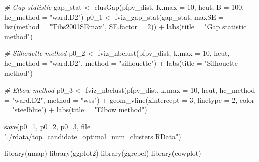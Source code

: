\documentclass[
  11pt,
  oneside]{book}
\newenvironment{Shaded}{\begin{snugshade}}{\end{snugshade}}
\newcommand{\AttributeTok}[1]{\textcolor[rgb]{0.77,0.63,0.00}{#1}}
\newcommand{\CommentTok}[1]{\textcolor[rgb]{0.56,0.35,0.01}{\textit{#1}}}
\newcommand{\DecValTok}[1]{\textcolor[rgb]{0.00,0.00,0.81}{#1}}
\newcommand{\FunctionTok}[1]{\textcolor[rgb]{0.00,0.00,0.00}{#1}}
\newcommand{\NormalTok}[1]{#1}
\newcommand{\OtherTok}[1]{\textcolor[rgb]{0.56,0.35,0.01}{#1}}
\newcommand{\SpecialCharTok}[1]{\textcolor[rgb]{0.00,0.00,0.00}{#1}}
\newcommand{\StringTok}[1]{\textcolor[rgb]{0.31,0.60,0.02}{#1}}
\begin{document}
\begin{Shaded}
\begin{Highlighting}[]
\CommentTok{\# Gap statistic}
\NormalTok{gap\_stat }\OtherTok{\textless{}{-}} \FunctionTok{clusGap}\NormalTok{(pfpv\_dist, }\AttributeTok{K.max =} \DecValTok{10}\NormalTok{, hcut, }\AttributeTok{B =} \DecValTok{100}\NormalTok{, }\AttributeTok{hc\_method =} \StringTok{"ward.D2"}\NormalTok{)}
\NormalTok{p0\_1 }\OtherTok{\textless{}{-}} \FunctionTok{fviz\_gap\_stat}\NormalTok{(gap\_stat, }\AttributeTok{maxSE =} \FunctionTok{list}\NormalTok{(}\AttributeTok{method =} \StringTok{"Tibs2001SEmax"}\NormalTok{, }\AttributeTok{SE.factor =} \DecValTok{2}\NormalTok{)) }\SpecialCharTok{+}
  \FunctionTok{labs}\NormalTok{(}\AttributeTok{title =} \StringTok{"Gap statistic method"}\NormalTok{)}

\CommentTok{\# Silhouette method}
\NormalTok{p0\_2 }\OtherTok{\textless{}{-}} \FunctionTok{fviz\_nbclust}\NormalTok{(pfpv\_dist, }\AttributeTok{k.max =} \DecValTok{10}\NormalTok{, hcut, }\AttributeTok{hc\_method =} \StringTok{"ward.D2"}\NormalTok{, }\AttributeTok{method =} \StringTok{"silhouette"}\NormalTok{) }\SpecialCharTok{+}
  \FunctionTok{labs}\NormalTok{(}\AttributeTok{title =} \StringTok{"Silhouette method"}\NormalTok{)}

\CommentTok{\# Elbow method}
\NormalTok{p0\_3 }\OtherTok{\textless{}{-}} \FunctionTok{fviz\_nbclust}\NormalTok{(pfpv\_dist, }\AttributeTok{k.max =} \DecValTok{10}\NormalTok{, hcut, }\AttributeTok{hc\_method =} \StringTok{"ward.D2"}\NormalTok{, }\AttributeTok{method =} \StringTok{"wss"}\NormalTok{) }\SpecialCharTok{+}
  \FunctionTok{geom\_vline}\NormalTok{(}\AttributeTok{xintercept =} \DecValTok{3}\NormalTok{, }\AttributeTok{linetype =} \DecValTok{2}\NormalTok{, }\AttributeTok{color =} \StringTok{"steelblue"}\NormalTok{) }\SpecialCharTok{+}
  \FunctionTok{labs}\NormalTok{(}\AttributeTok{title =} \StringTok{"Elbow method"}\NormalTok{)}

\FunctionTok{save}\NormalTok{(p0\_1, p0\_2, p0\_3, }\AttributeTok{file =} \StringTok{"./rdata/top\_candidate\_optimal\_num\_clusters.RData"}\NormalTok{)}
\end{Highlighting}
\end{Shaded}

\begin{Shaded}
\begin{Highlighting}[]
\FunctionTok{library}\NormalTok{(umap)}
\FunctionTok{library}\NormalTok{(ggplot2)}
\FunctionTok{library}\NormalTok{(ggrepel)}
\FunctionTok{library}\NormalTok{(cowplot)}
\end{Highlighting}
\end{Shaded}
\end{document}
